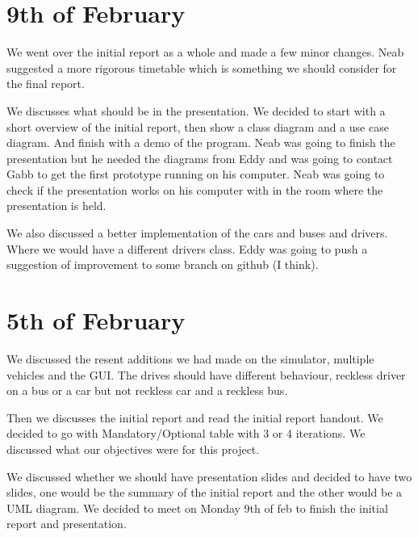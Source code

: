 \documentclass[11pt]{article}
\begin{document}
\section{9th of February}
We went over the initial report as a whole and made a few minor changes. Neab suggested a more rigorous timetable which is something we should consider for the final report.

We discusses what should be in the presentation. We decided to start with a short overview of the initial report, then show a class diagram and a use case diagram. And finish with a demo of the program. Neab was going to finish the presentation but he needed the diagrams from Eddy and was going to contact Gabb to get the first prototype running on his computer. Neab was going to check if the presentation works on his computer with in the room where the presentation is held.

We also discussed a better implementation of the cars and buses and drivers. Where we would have a different drivers class. Eddy was going to push a suggestion of improvement to some branch on github (I think).

\section{5th of February}
We discussed the resent additions we had made on the simulator, multiple vehicles and the GUI. The drives should have different behaviour, reckless driver on a bus or a car but not reckless car and a reckless bus.

Then we discusses the initial report and read the initial report handout. We decided to go with Mandatory/Optional table with 3 or 4 iterations. We discussed what our objectives were for this project.

We discussed whether we should have presentation slides and decided to have two slides, one would be the summary of the initial report and the other would be a UML diagram. We decided to meet on Monday 9th of feb to finish the initial report and presentation.

\newpage
\end{document}
